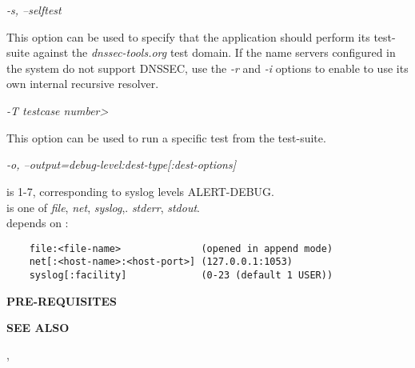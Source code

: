 \begin{description}
\item {\it -s, --selftest}\verb" "

This option can be used to specify that the application should perform its
test-suite against the {\it dnssec-tools.org} test domain. If the name servers
configured in the system  do not support DNSSEC, use the
{\it -r} and {\it -i} options to enable  to use its own internal
recursive resolver.

\item {\it -T testcase number>}\verb" "

This option can be used to run a specific test from the test-suite.

\item {\it -o, --output=debug-level:dest-type[:dest-options]}\verb" "

 is 1-7, corresponding to syslog levels ALERT-DEBUG. \\
 is one of {\it file}, {\it net}, {\it syslog},.
{\it stderr}, {\it stdout}. \\
 depends on :
\begin{verbatim}
    file:<file-name>              (opened in append mode)
    net[:<host-name>:<host-port>] (127.0.0.1:1053)
    syslog[:facility]             (0-23 (default 1 USER))
\end{verbatim}

\end{description}

{\bf PRE-REQUISITES}


{\bf SEE ALSO}


, 
